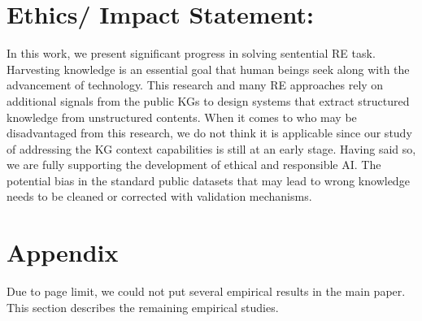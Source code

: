 \documentclass[11pt,a4paper]{article}
\begin{document}
\section{Ethics/ Impact Statement:}
In this work, we present significant progress in solving sentential RE task. 
Harvesting knowledge is an essential goal that human beings seek along with the advancement of technology. This research and many RE approaches rely on additional signals from the public KGs to design systems that extract structured knowledge from unstructured contents. When it comes to who may be disadvantaged from this research, we do not think it is applicable
since our study of addressing the KG context capabilities is still at an early stage.
Having said so,
we are fully supporting the development of ethical and responsible AI. The potential bias in the standard public datasets
that may lead to wrong knowledge needs to be cleaned or corrected with validation mechanisms. 


 
\appendix

\section{Appendix}
Due to page limit, we could not put several empirical results in the main paper. This section describes the remaining empirical studies. 
\end{document}
